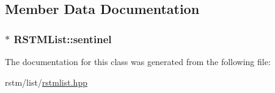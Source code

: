 \subsection{Member Data Documentation}
\hypertarget{classRSTMList_a241dd3aff70d607fbd037b4792434a5a}{
\subsubsection[{sentinel}]{$\ast$ R\-S\-T\-M\-List\-::sentinel}}\label{classRSTMList_a241dd3aff70d607fbd037b4792434a5a}


The documentation for this class was generated from the following file\-:\begin{DoxyCompactItemize}
\item 
rstm/list/\hyperlink{rstmlist_8hpp}{rstmlist.\-hpp}\end{DoxyCompactItemize}
